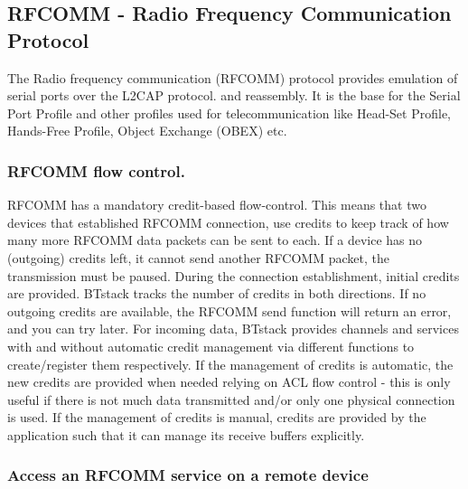 \subsection{RFCOMM - Radio Frequency Communication Protocol}
The Radio frequency communication (RFCOMM) protocol provides emulation of serial ports over the L2CAP protocol.
and reassembly. It is the base for the Serial Port Profile and other profiles used for telecommunication like Head-Set Profile, Hands-Free Profile, Object Exchange (OBEX) etc.

\subsubsection{RFCOMM flow control.}
RFCOMM has a mandatory credit-based flow-control. This means that two devices that established RFCOMM connection, use credits to keep track of how many more RFCOMM data packets can be sent to each. If a device has no (outgoing) credits left, it cannot send another RFCOMM packet, the transmission must be paused. During the connection establishment, initial credits are provided. BTstack tracks the number of credits in both directions. If no outgoing credits are available, the RFCOMM send function will return an error, and you can try later. For incoming data, BTstack provides channels and services with and without automatic credit management via different functions to create/register them respectively. If the management of credits is automatic, the new credits are provided when needed relying on ACL flow control - this is only useful if there is not much data transmitted and/or only one physical connection is used. If the management of credits is manual, credits are provided by the application such that it can manage its receive buffers explicitly. 


\subsubsection{Access an RFCOMM service on a remote device}
\label{subsubsection:rfcommlient}

